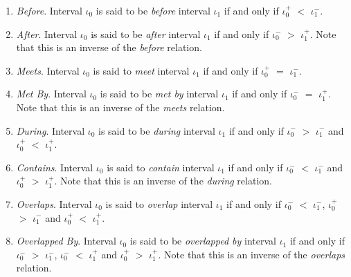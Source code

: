 \documentclass[11pt]{report}
\begin{document}
        \begin{enumerate}
          \item
            {\em Before}.
            Interval $\iota_0$ is said to be {\em before} interval $\iota_1$
            if and only if $\iota_0^+$ $<$ $\iota_1^-$.

          \item
            {\em After}.
            Interval $\iota_0$ is said to be {\em after} interval $\iota_1$ if
            and only if $\iota_0^-$ $>$ $\iota_1^+$. Note that this is an
            inverse of the {\em before} relation.

          \item
            {\em Meets}.
            Interval $\iota_0$ is said to {\em meet} interval $\iota_1$ if and
            only if $\iota_0^+$ $=$ $\iota_1^-$.

          \item
            {\em Met By}.
            Interval $\iota_0$ is said to be {\em met by} interval $\iota_1$ if
            and only if $\iota_0^-$ $=$ $\iota_1^+$. Note that this is an
            inverse of the {\em meets} relation.

          \item
            {\em During}.
            Interval $\iota_0$ is said to be {\em during} interval $\iota_1$ if
            and only if $\iota_0^-$ $>$ $\iota_1^-$ and $\iota_0^+$ $<$
            $\iota_1^+$.

          \item
            {\em Contains}.
            Interval $\iota_0$ is said to {\em contain} interval $\iota_1$ if
            and only if $\iota_0^-$ $<$ $\iota_1^-$ and $\iota_0^+$ $>$
            $\iota_1^+$. Note that this is an inverse of the {\em during}
            relation.

          \item
            {\em Overlaps}.
            Interval $\iota_0$ is said to {\em overlap} interval $\iota_1$ if
            and only if $\iota_0^-$ $<$ $\iota_1^-$, $\iota_0^+$ $>$
            $\iota_1^-$ and $\iota_0^+$ $<$ $\iota_1^+$.

          \item
            {\em Overlapped By}.
            Interval $\iota_0$ is said to be {\em overlapped by} interval
            $\iota_1$ if and only if $\iota_0^-$ $>$ $\iota_1^-$, $\iota_0^-$
            $<$ $\iota_1^+$ and $\iota_0^+$ $>$ $\iota_1^+$. Note that this is
            an inverse of the {\em overlaps} relation.


\end{enumerate}
\end{document}
